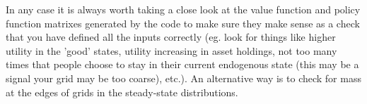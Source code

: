 \documentclass[11pt,fleqn]{article}
\begin{document}
In any case it is always worth taking a close look at the value function and policy function matrixes generated by the code to make sure they make sense as a check that you have defined all the inputs correctly (eg. look for things like higher utility in the 'good' states, utility increasing in asset  holdings, not too many times that people choose to stay in their current endogenous state (this may be a signal your grid may be too coarse), etc.). An alternative way is to check for mass at the edges of grids in the steady-state distributions.

\newpage

% 
% 
% 
% 

% 
% 
\end{document}
